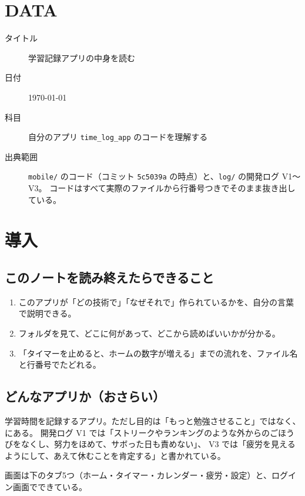 \section{DATA}
\begin{description}
  \item[タイトル] 学習記録アプリの中身を読む
  \item[日付] \today
  \item[科目] 自分のアプリ \texttt{time\_log\_app} のコードを理解する
  \item[出典範囲] \texttt{mobile/} のコード（コミット \texttt{5c5039a} の時点）と、\texttt{log/} の開発ログ V1〜V3。
    コードはすべて実際のファイルから行番号つきでそのまま抜き出している。
\end{description}

\section{導入}

\subsection{このノートを読み終えたらできること}
\begin{enumerate}
  \item このアプリが「どの技術で」「なぜそれで」作られているかを、自分の言葉で説明できる。
  \item フォルダを見て、どこに何があって、どこから読めばいいかが分かる。
  \item 「タイマーを止めると、ホームの数字が増える」までの流れを、ファイル名と行番号でたどれる。
\end{enumerate}

\subsection{どんなアプリか（おさらい）}
学習時間を記録するアプリ。ただし目的は「もっと勉強させること」ではなく、
にある。
開発ログ V1 では「ストリークやランキングのような外からのごほうびをなくし、努力をほめて、サボった日も責めない」、
V3 では「疲労を見えるようにして、あえて休むことを肯定する」と書かれている。\evLog

画面は下のタブ5つ（ホーム・タイマー・カレンダー・疲労・設定）と、ログイン画面でできている。

